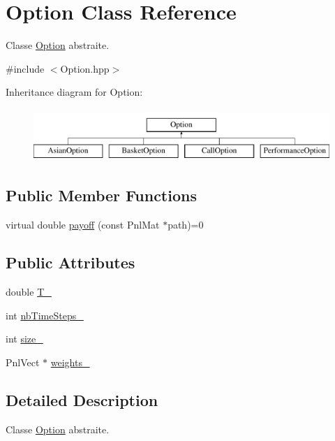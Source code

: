 \hypertarget{classOption}{\section{Option Class Reference}
\label{classOption}
}


Classe \hyperlink{classOption}{Option} abstraite.  




{\ttfamily \#include $<$Option.\-hpp$>$}

Inheritance diagram for Option\-:\begin{figure}[H]
\begin{center}
\leavevmode
\includegraphics[height=2.000000cm]{classOption}
\end{center}
\end{figure}
\subsection*{Public Member Functions}
\begin{DoxyCompactItemize}
\item 
virtual double \hyperlink{classOption_abe90882a11f5436077425249e3f32204}{payoff} (const Pnl\-Mat $\ast$path)=0
\end{DoxyCompactItemize}
\subsection*{Public Attributes}
\begin{DoxyCompactItemize}
\item 
double \hyperlink{classOption_a89f0365b68626cc5eb523f12159e0764}{T\-\_\-}
\item 
int \hyperlink{classOption_ad424223ea2698144e823c494d625fbe0}{nb\-Time\-Steps\-\_\-}
\item 
int \hyperlink{classOption_a65fae5103b50f953f29a86b1a17b4540}{size\-\_\-}
\item 
Pnl\-Vect $\ast$ \hyperlink{classOption_a8f5978de54bbccdc3af36f30eaae1fdb}{weights\-\_\-}
\end{DoxyCompactItemize}


\subsection{Detailed Description}
Classe \hyperlink{classOption}{Option} abstraite. 

